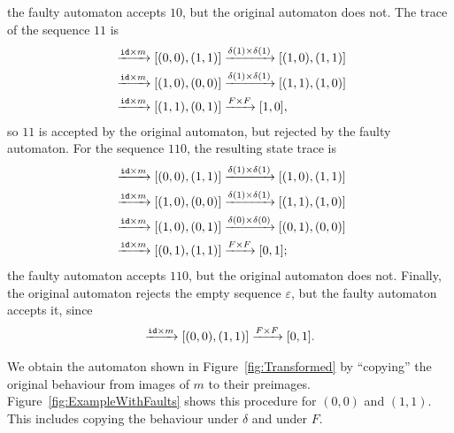 the faulty automaton accepts $10$, but the original automaton does not. 
The trace of the sequence $11$ is 
\begin{align*}
    [(0,0),(0,0)]&\xrightarrow{\id\times m}[(0,0),(1,1)]\xrightarrow{\delta(1)\times\delta(1)}[(1,0),(1,1)]\\
   &\xrightarrow{\id\times m}[(1,0),(0,0)]\xrightarrow{\delta(1)\times\delta(1)}[(1,1),(1,0)]\\
   &\xrightarrow{\id\times m}[(1,1),(0,1)]\xrightarrow{F\times F}[1,0],
\end{align*}
so $11$ is accepted by the original automaton, but rejected by the faulty automaton. 
For the sequence $110$, the resulting state trace is 
\begin{align*}
    [(0,0),(0,0)]&\xrightarrow{\id\times m}[(0,0),(1,1)]\xrightarrow{\delta(1)\times\delta(1)}[(1,0),(1,1)]\\
   &\xrightarrow{\id\times m}[(1,0),(0,0)]\xrightarrow{\delta(1)\times\delta(1)}[(1,1),(1,0)]\\
   &\xrightarrow{\id\times m}[(1,0),(0,1)]\xrightarrow{\delta(0)\times\delta(0)}[(0,1),(0,0)]\\
   &\xrightarrow{\id\times m}[(0,1),(1,1)]\xrightarrow{F\times F}[0,1];
\end{align*}
the faulty automaton accepts $110$, but the original automaton does not. Finally, the original automaton rejects the empty sequence $\varepsilon$, but the faulty automaton accepts it, since 
\begin{align*}
    [(0,0),(0,0)]\xrightarrow{\id\times m}[(0,0),(1,1)]\xrightarrow{F\times F}[0,1].
\end{align*} 


We obtain the automaton shown in Figure~\ref{fig:Transformed} by ``copying'' the original behaviour from images of $m$ to their preimages. Figure~\ref{fig:ExampleWithFaults} shows this procedure for $(0,0)$ and $(1,1)$. This includes copying the behaviour under $\delta$ and under $F$. 

